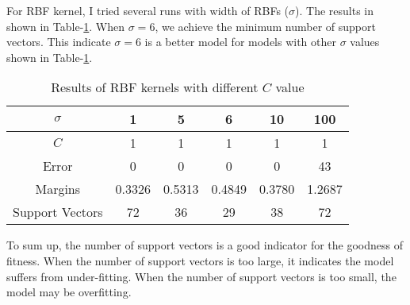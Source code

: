 \documentclass[12pt]{article}
\begin{document}
For RBF kernel, I tried several runs with width of RBFs ($\sigma$). The results in shown in Table-\ref{tab:rbf}. When $\sigma=6$, we achieve the minimum number of support vectors. This indicate $\sigma=6$ is a better model for models with other $\sigma$ values shown in Table-\ref{tab:rbf}. \\

\begin{table}[ht!]
  \begin{center}
    \begin{tabular}{|c|c|c|c|c|c|}
      \hline
      $\sigma$	  &    1   &   5    &    6   &   10   &  100   \\ \hline
      $C$         &    1   &   1    &    1   &    1   &    1   \\ \hline
      Error       &    0   &   0    &    0   &    0   &   43   \\ \hline
      Margins     & 0.3326 & 0.5313 & 0.4849 & 0.3780 & 1.2687 \\ \hline
      Support Vectors & 72 &  36    &   29   &   38   &   72   \\ \hline
    \end{tabular}
  \end{center}
  \caption{Results of RBF kernels with different $C$ value 
    \label{tab:rbf}}
\end{table}

To sum up, the number of support vectors is a good indicator for the goodness of fitness. When the number of support vectors is too large, it indicates the model suffers from under-fitting. When the number of support vectors is too small, the model may be overfitting.
\end{document}
